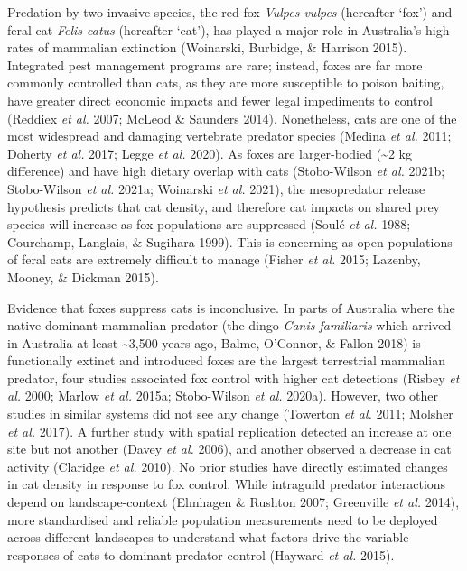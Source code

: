 \documentclass[11pt,a4paper,titlepage,twoside,openright]{style/unimelbthesis}
\begin{document}
\begin{mainmatter}
Predation by two invasive species, the red fox \emph{Vulpes vulpes} (hereafter `fox') and feral cat \emph{Felis catus} (hereafter `cat'), has played a major role in Australia's high rates of mammalian extinction (Woinarski, Burbidge, \& Harrison 2015). Integrated pest management programs are rare; instead, foxes are far more commonly controlled than cats, as they are more susceptible to poison baiting, have greater direct economic impacts and fewer legal impediments to control (Reddiex \emph{et al.} 2007; McLeod \& Saunders 2014). Nonetheless, cats are one of the most widespread and damaging vertebrate predator species (Medina \emph{et al.} 2011; Doherty \emph{et al.} 2017; Legge \emph{et al.} 2020). As foxes are larger-bodied (\textasciitilde2 kg difference) and have high dietary overlap with cats (Stobo-Wilson \emph{et al.} 2021b; Stobo-Wilson \emph{et al.} 2021a; Woinarski \emph{et al.} 2021), the mesopredator release hypothesis predicts that cat density, and therefore cat impacts on shared prey species will increase as fox populations are suppressed (Soulé \emph{et al.} 1988; Courchamp, Langlais, \& Sugihara 1999). This is concerning as open populations of feral cats are extremely difficult to manage (Fisher \emph{et al.} 2015; Lazenby, Mooney, \& Dickman 2015).

Evidence that foxes suppress cats is inconclusive. In parts of Australia where the native dominant mammalian predator (the dingo \emph{Canis familiaris} which arrived in Australia at least \textasciitilde3,500 years ago, Balme, O'Connor, \& Fallon 2018) is functionally extinct and introduced foxes are the largest terrestrial mammalian predator, four studies associated fox control with higher cat detections (Risbey \emph{et al.} 2000; Marlow \emph{et al.} 2015a; Stobo-Wilson \emph{et al.} 2020a). However, two other studies in similar systems did not see any change (Towerton \emph{et al.} 2011; Molsher \emph{et al.} 2017). A further study with spatial replication detected an increase at one site but not another (Davey \emph{et al.} 2006), and another observed a decrease in cat activity (Claridge \emph{et al.} 2010). No prior studies have directly estimated changes in cat density in response to fox control. While intraguild predator interactions depend on landscape-context (Elmhagen \& Rushton 2007; Greenville \emph{et al.} 2014), more standardised and reliable population measurements need to be deployed across different landscapes to understand what factors drive the variable responses of cats to dominant predator control (Hayward \emph{et al.} 2015).


\end{mainmatter}
\end{document}
